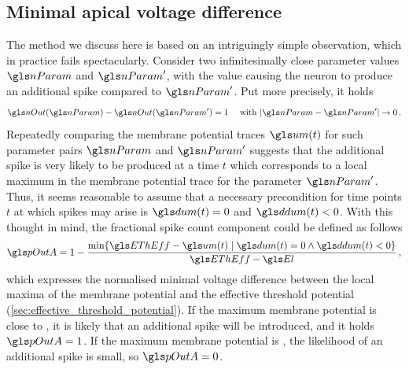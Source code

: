 \subsection{Minimal apical voltage difference}
The method we discuss here is based on an intriguingly simple observation, which in practice fails spectacularly. Consider two infinitesimally close parameter values $\nParam$ and $\nParam'$, with the value \nParam causing the neuron to produce an additional spike compared to $\nParam'$. Put more precisely, it holds
\begin{align}
\nOut(\nParam) - \nOut(\nParam') = 1 \quad \text{ with } |\nParam - \nParam'| \to 0 \,.
\end{align}
Repeatedly comparing the membrane potential traces $\um(t)$ for such parameter pairs $\nParam$ and $\nParam'$ suggests that the additional spike is very likely to be produced at a time $t$ which corresponds to a local maximum in the membrane potential trace for the parameter $\nParam'$. Thus, it seems reasonable to assume that a necessary precondition for time points $t$ at which spikes may arise is $\dum(t) = 0$ and $\ddum(t) < 0$. With this thought in mind, the fractional spike count component \pOutA could be defined as follows
\begin{align}
	\pOutA = 1 - \frac{\min \{\EThEff - \um(t) \mid \dum(t) = 0 \wedge \ddum(t) < 0\}}{\EThEff - \El} \,,
	\label{eqn:mavd}
\end{align}
which expresses the normalised minimal voltage difference between the local maxima of the membrane potential and the effective threshold potential \EThEff (\cref{sec:effective_threshold_potential}). If the maximum membrane potential is close to \EThEff, it is likely that an additional spike will be introduced, and it holds $\pOutA = 1$. If the maximum membrane potential is \El, the likelihood of an additional spike is small, so  $\pOutA = 0$.

